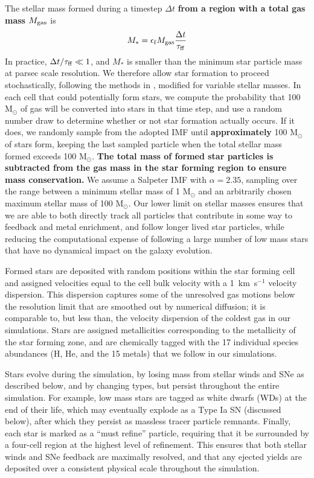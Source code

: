 \documentclass[fleqn,usenatbib,useAMS]{mnras}
\begin{document}
The stellar mass formed during a timestep $\Delta t$ \textbf{from a region with a total gas mass $M_{\rm gas}$} is
\begin{equation}
         M_* = \epsilon_{\rm f} M_{\rm gas} \frac{\Delta t}{\tau_{\rm ff}}
\end{equation}
In practice, $\Delta t/\tau_{\rm ff} \ll 1$, and $M_*$ is smaller than the minimum star particle mass at parsec scale resolution. We therefore allow star formation to proceed stochastically, following the methods in \citet{Goldbaum2015, Goldbaum2016}, modified for variable stellar masses. In each cell that could potentially form stars, we compute the probability that 100 M$_{\odot}$ of gas will be converted into stars in that time step, and use a random number draw to determine whether or not star formation actually occurs. If it does, we randomly sample from
the adopted IMF until \textbf{approximately} 100 M$_{\odot}$ of stars form, keeping the last sampled particle when the total stellar mass formed exceeds 100 M$_{\odot}$. \textbf{The total mass of formed star particles is subtracted from the gas mass in the star forming region to ensure mass conservation.} We assume a Salpeter IMF \citep{Salpeter1955} with $\alpha = 2.35$, sampling over the range between a minimum stellar mass of 1 M$_{\odot}$ and an arbitrarily chosen maximum stellar mass of 100 M$_{\odot}$. Our lower limit on stellar masses ensures that we are able to both directly track all particles that contribute in some way to feedback and metal enrichment, and follow longer lived star particles, while reducing the computational expense of following a large number of low mass stars that have no dynamical impact on the galaxy evolution.

Formed stars are deposited with random positions within the star forming cell and assigned velocities equal to the cell bulk velocity with a 1~km~s$^{-1}$ velocity dispersion. This dispersion captures some of the unresolved gas motions below the resolution limit that are smoothed out by numerical diffusion; it is comparable to, but less than, the velocity dispersion of the coldest gas in our simulations. Stars are assigned metallicities corresponding to the metallicity of the star forming zone, and are chemically tagged with the 17 individual species abundances (H, He, and the 15 metals) that we follow in our simulations. 

Stars evolve during the simulation, by losing mass from stellar winds and SNe as described below, and by changing types, but persist throughout the entire simulation. For example, low mass stars are tagged as white dwarfs (WDs) at the end of their life, which may eventually explode as a Type Ia SN (discussed below), after which they persist as massless tracer particle remnants. Finally, each star is marked as a ``must refine'' particle, requiring that it be surrounded by a four-cell region at the highest level of refinement. This ensures that both stellar winds and SNe feedback are maximally resolved, and that any ejected yields are deposited over a consistent physical scale throughout the simulation.
\end{document}

